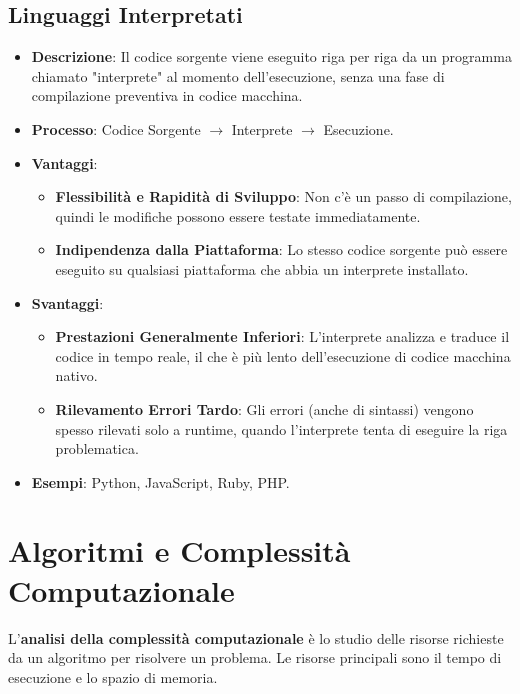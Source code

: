 \subsection{Linguaggi Interpretati}
\begin{itemize}
    \item \textbf{Descrizione}: Il codice sorgente viene eseguito riga per riga da un programma chiamato "interprete" al momento dell'esecuzione, senza una fase di compilazione preventiva in codice macchina.
    \item \textbf{Processo}: Codice Sorgente $\rightarrow$ Interprete $\rightarrow$ Esecuzione.
    \item \textbf{Vantaggi}:
    \begin{itemize}
        \item \textbf{Flessibilità e Rapidità di Sviluppo}: Non c'è un passo di compilazione, quindi le modifiche possono essere testate immediatamente.
        \item \textbf{Indipendenza dalla Piattaforma}: Lo stesso codice sorgente può essere eseguito su qualsiasi piattaforma che abbia un interprete installato.
    \end{itemize}
    \item \textbf{Svantaggi}:
    \begin{itemize}
        \item \textbf{Prestazioni Generalmente Inferiori}: L'interprete analizza e traduce il codice in tempo reale, il che è più lento dell'esecuzione di codice macchina nativo.
        \item \textbf{Rilevamento Errori Tardo}: Gli errori (anche di sintassi) vengono spesso rilevati solo a runtime, quando l'interprete tenta di eseguire la riga problematica.
    \end{itemize}
    \item \textbf{Esempi}: Python, JavaScript, Ruby, PHP.
\end{itemize}

\section{Algoritmi e Complessità Computazionale}
L'\textbf{analisi della complessità computazionale} è lo studio delle risorse richieste da un algoritmo per risolvere un problema. Le risorse principali sono il tempo di esecuzione e lo spazio di memoria.

